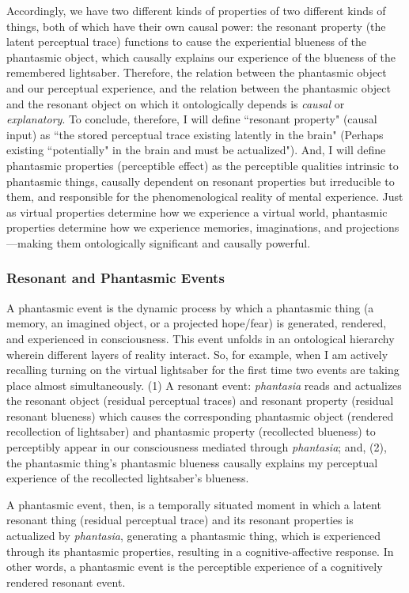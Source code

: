 \documentclass{article}
\begin{document}
Accordingly, we have two different kinds of properties of two different kinds of things, both of which have their own causal power: the resonant property (the latent perceptual trace) functions to cause the experiential blueness of the phantasmic object, which causally explains our experience of the blueness of the remembered lightsaber. Therefore, the relation between the phantasmic object and our perceptual experience, and the relation between the phantasmic object and the resonant object on which it ontologically depends is \textit{causal} or \textit{explanatory}. To conclude, therefore, I will define “resonant property" (causal input) as “the stored perceptual trace existing latently in the brain" (Perhaps existing “potentially" in the brain and must be actualized"). And, I will define phantasmic properties (perceptible effect) as the perceptible qualities intrinsic to phantasmic things, causally dependent on resonant properties but irreducible to them, and responsible for the phenomenological reality of mental experience. Just as virtual properties determine how we experience a virtual world, phantasmic properties determine how we experience memories, imaginations, and projections—making them ontologically significant and causally powerful.

\subsubsection*{Resonant and Phantasmic Events}

A phantasmic event is the dynamic process by which a phantasmic thing (a memory, an imagined object, or a projected hope/fear) is generated, rendered, and experienced in consciousness. This event unfolds in an ontological hierarchy wherein different layers of reality interact. So, for example, when I am actively recalling turning on the virtual lightsaber for the first time two events are taking place almost simultaneously. (1) A resonant event: \textit{phantasia} reads and actualizes the resonant object (residual perceptual traces) and resonant property (residual resonant blueness) which causes the corresponding phantasmic object (rendered recollection of lightsaber) and phantasmic property (recollected blueness) to perceptibly appear in our consciousness mediated through \textit{phantasia}; and, (2), the phantasmic thing's phantasmic blueness causally explains my perceptual experience of the recollected lightsaber's blueness.

A phantasmic event, then, is a temporally situated moment in which a latent resonant thing (residual perceptual trace) and its resonant properties is actualized by \textit{phantasia}, generating a phantasmic thing, which is experienced through its phantasmic properties, resulting in a cognitive-affective response. In other words, a phantasmic event is the perceptible experience of a cognitively rendered resonant event.
\end{document}

